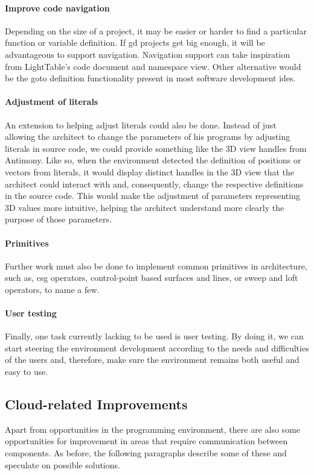 \paragraph{Improve code navigation}
Depending on the size of a project, it may be easier or harder to find a particular function or variable definition.
If \gls{gd} projects get big enough, it will be advantageous to support navigation.
Navigation support can take inspiration from LightTable's code document and namespace view.
Other alternative would be the goto definition functionality present in most software development \glspl{ide}.

\paragraph{Adjustment of literals}
An extension to helping adjust literals could also be done.
Instead of just allowing the architect to change the parameters of his programs by adjusting literals in source code, we could provide something like the 3D view handles from Antimony.
Like so, when the environment detected the definition of positions or vectors from literals, it would display distinct handles in the 3D view that the architect could interact with and, consequently, change the respective definitions in the source code.
This would make the adjustment of parameters representing 3D values more intuitive, helping the architect understand more clearly the purpose of those parameters.

\paragraph{Primitives}
Further work must also be done to implement common primitives in architecture, such as, \gls{csg} operators, control-point based surfaces and lines, or sweep and loft operators, to name a few.

\paragraph{User testing}
Finally, one task currently lacking to be used is user testing.
By doing it, we can start steering the environment development according to the needs and difficulties of the users and, therefore, make sure the environment remains both useful and easy to use.


\subsection{Cloud-related Improvements}
Apart from opportunities in the programming environment, there are also some opportunities for improvement in areas that require communication between components.
As before, the following paragraphs describe some of these and speculate on possible solutions.

